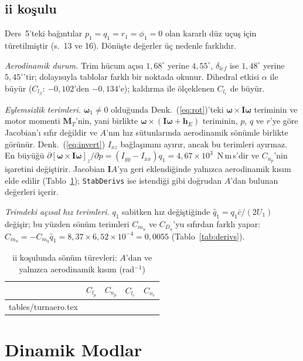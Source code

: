 \documentclass[conf]{new-aiaa}
\makeatletter
\newcommand\tabinput[1]{\@@input #1 }
\makeatother
\begin{document}
\subsection{ii koşulu}
Ders~5'teki bağıntılar $p_1=q_1=r_1=\phi_1=0$ olan kararlı düz uçuş için türetilmiştir (s.~13 ve 16). Dönüşte değerler üç nedenle farklıdır.

\emph{Aerodinamik durum.} Trim hücum açısı $1,68^\circ$ yerine $4,55^\circ$, $\delta_{lef}$ ise $1,48^\circ$ yerine $5,45^\circ$'tir; dolayısıyla tablolar farklı bir noktada okunur. Dihedral etkisi $\alpha$ ile büyür ($C_{l_\beta}$: $-0,102$'den $-0,134$'e); kaldırma ile ölçeklenen $C_{l_r}$ de büyür.

\emph{Eylemsizlik terimleri.} $\boldsymbol\omega_1\neq0$ olduğunda Denk.~(\ref{eq:rot})'teki $\boldsymbol\omega\times\mathbf I\boldsymbol\omega$ teriminin ve motor momenti $\mathbf M_T$'nin, yani birlikte $\boldsymbol\omega\times(\mathbf I\boldsymbol\omega+\mathbf h_E)$ teriminin, $p$, $q$ ve $r$'ye göre Jacobian'ı sıfır değildir ve $A$'nın hız sütunlarında aerodinamik sönümle birlikte görünür. Denk.~(\ref{eq:invert}) $I_{xz}$ bağlaşımını ayırır, ancak bu terimleri ayırmaz. En büyüğü $\partial[\boldsymbol\omega\times\mathbf I\boldsymbol\omega]_z/\partial p=(I_{yy}-I_{xx})q_1=4,67\times10^{3}$~N\,m\,s'dir ve $C_{n_p}$'nin işaretini değiştirir. Jacobian $\mathbf I A$'ya geri eklendiğinde yalnızca aerodinamik kısım elde edilir (Tablo~\ref{tab:turnaero}); \texttt{StabDerivs} ise istendiği gibi doğrudan $A$'dan bulunan değerleri içerir.

\emph{Trimdeki açısal hız terimleri.} $q_1$ sabitken hız değiştiğinde $\hat q_1=q_1\bar c/(2U_1)$ değişir; bu yüzden sönüm terimleri $C_{m_u}$ ve $C_{D_u}$'yu sıfırdan farklı yapar: $C_{m_u}=-C_{m_q}\hat q_1=8,37\times6,52\times10^{-4}=0,0055$ (Tablo~\ref{tab:derivs}).

\begin{table}[hbt!]
\caption{\label{tab:turnaero} ii koşulunda sönüm türevleri: $A$'dan ve yalnızca aerodinamik kısım (rad$^{-1}$)}
\centering
\begin{tabular}{lcccc}
\toprule
 & $C_{l_p}$ & $C_{n_p}$ & $C_{l_r}$ & $C_{n_r}$ \\
\midrule
\tabinput{tables/turnaero.tex}
\bottomrule
\end{tabular}
\end{table}

\section{Dinamik Modlar}
\end{document}
